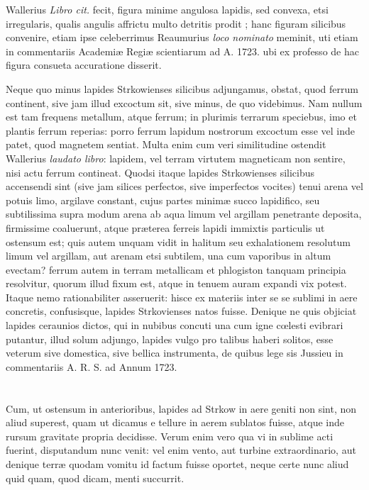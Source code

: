\documentclass[a4paper, 11pt, oneside, polutonikogreek, latin]{article}
\begin{document}
Wallerius \emph{Libro cit.} fecit, figura minime angulosa lapidis, sed convexa, etsi irregularis, qualis angulis affrictu multo detritis prodit ; hanc figuram silicibus convenire, etiam ipse celeberrimus Reaumurius \emph{loco nominato} meminit, uti etiam in commentariis Academiæ Regiæ scientiarum ad A. 1723. ubi ex professo de hac figura consueta accuratione disserit.

Neque quo minus lapides Strkowienses silicibus adjungamus, obstat, quod ferrum continent, sive jam illud excoctum sit, sive minus, de quo videbimus. Nam nullum est tam frequens metallum, atque ferrum; in plurimis terrarum speciebus, imo et plantis ferrum reperias: porro ferrum lapidum nostrorum excoctum esse vel inde patet, quod magnetem sentiat.  Multa enim cum veri similitudine ostendit Wallerius \emph{laudato libro}: lapidem, vel terram virtutem magneticam non sentire, nisi actu ferrum contineat. Quodsi itaque lapides Strkowienses silicibus accensendi sint (sive jam silices perfectos, sive imperfectos vocites) tenui arena vel potuis limo, argilave constant, cujus partes minimæ succo lapidifico, seu subtilissima supra modum arena ab aqua limum vel argillam penetrante deposita, firmissime coaluerunt, atque præterea ferreis lapidi immixtis particulis ut ostensum est; quis autem unquam vidit in halitum seu exhalationem resolutum limum vel argillam, aut arenam etsi subtilem, una cum vaporibus in altum evectam? ferrum autem in terram metallicam et phlogiston tanquam principia resolvitur, quorum illud fixum est, atque in tenuem auram expandi vix potest. Itaque nemo rationabiliter asseruerit: hisce ex materiis inter se se sublimi in aere concretis, confusisque, lapides Strkovienses natos fuisse. Denique ne quis objiciat lapides ceraunios dictos, qui in nubibus concuti una cum igne cœlesti evibrari putantur, illud solum adjungo, lapides vulgo pro talibus haberi solitos, esse veterum sive domestica, sive bellica instrumenta, de quibus lege sis Jussieu in commentariis A. R. S. ad Annum 1723.
\clearpage
\section[Lapides Strkowienses e tellure in aerem sunt sublati.]{}
\paragraph{}
Cum, ut ostensum in anterioribus, lapides ad Strkow in aere geniti non sint, non aliud superest, quam ut dicamus e tellure in aerem sublatos fuisse, atque inde rursum gravitate propria decidisse. Verum enim vero qua vi in sublime acti fuerint, disputandum nunc venit: vel enim vento, aut turbine extraordinario, aut denique terræ quodam vomitu id factum fuisse oportet, neque certe nunc aliud quid quam, quod dicam, menti succurrit.
\clearpage
\end{document}
